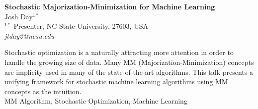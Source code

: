 \documentclass[12pt]{article}
\begin{document}
\pagestyle{empty}
\begin{center}
{\large\bf Stochastic Majorization-Minimization for Machine Learning}
\\[3mm]
Josh Day$^{1 \ast}$
\\[4mm]
$^{1 \ast}$ Presenter, NC State University, 27603, USA\\
{\it jtday2@ncsu.edu}\\
\end{center}

\bigskip

Stochastic optimization is a naturally attracting more attention in order to handle the growing size of data.  Many MM (Majorization-Minimization) concepts are implicity used in many of the state-of-the-art algorithms.  This talk presents a unifying framework for stochastic machine learning algorithms using MM concepts as the intuition.\\[3ex]


 MM Algorithm, Stochastic Optimization, Machine Learning
\end{document}
